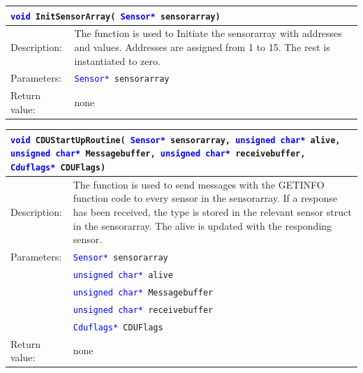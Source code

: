 \begin{table}[H]
\begin{tabular}{l p{12.5cm}}
\multicolumn{2}{l}{\texttt{\textcolor{blue}{void} InitSensorArray( \texttt{\textcolor{blue}{Sensor*} sensorarray})}} \\
\hline
Description:& The function is used to Initiate the sensorarray with addresses and values. Addresses are assigned from 1 to 15. The rest is instantiated to zero.\\
Parameters:&\texttt{\textcolor{blue}{Sensor*} sensorarray}\\
Return value:&none\\
\end{tabular}
\end{table}

\begin{table}[H]
\begin{tabular}{l p{12.5cm}}
\multicolumn{2}{p{15cm}}{\texttt{\textcolor{blue}{void} CDUStartUpRoutine( \texttt{\textcolor{blue}{Sensor*} sensorarray, \textcolor{blue}{unsigned char*} alive, \textcolor{blue}{unsigned char*} Messagebuffer, \textcolor{blue}{unsigned char*} receivebuffer, \textcolor{blue}{Cduflags*} CDUFlags})}} \\
\hline
Description:& The function is used to send messages with the GETINFO function code to every sensor in the sensorarray. If a response has been received, the type is stored in the relevant sensor struct in the sensorarray. The alive is updated with the responding sensor.\\
Parameters:&\texttt{\textcolor{blue}{Sensor*} sensorarray}\\
&\texttt{\textcolor{blue}{unsigned char*} alive}\\
&\texttt{\textcolor{blue}{unsigned char*} Messagebuffer}\\
&\texttt{\textcolor{blue}{unsigned char*} receivebuffer}\\
&\texttt{\textcolor{blue}{Cduflags*} CDUFlags}\\
Return value:&none\\
\end{tabular}
\end{table}

